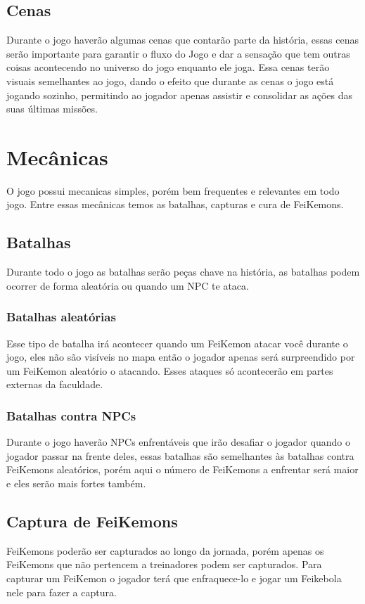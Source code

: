 \documentclass[a4paper,12pt]{article}
\begin{document}
\subsection{Cenas}
Durante o jogo haverão algumas cenas que contarão parte da história, essas cenas serão importante para garantir o fluxo do Jogo
e dar a sensação que tem outras coisas acontecendo no universo do jogo enquanto ele joga. Essa cenas terão visuais semelhantes ao jogo, dando
o efeito que durante as cenas o jogo está jogando sozinho, permitindo ao jogador apenas assistir e consolidar as ações das suas últimas missões.

\newpage
\section{Mecânicas}
O jogo possui mecanicas simples, porém bem frequentes e relevantes em todo jogo. Entre essas mecânicas temos as batalhas, capturas e cura de FeiKemons.

\subsection{Batalhas}
Durante todo o jogo as batalhas serão peças chave na história, as batalhas podem ocorrer de forma aleatória ou quando um NPC te ataca.

\subsubsection{Batalhas aleatórias}
Esse tipo de batalha irá acontecer quando um FeiKemon atacar você durante o jogo, eles não são visíveis no mapa então o jogador apenas
será surpreendido por um FeiKemon aleatório o atacando. Esses ataques só acontecerão em partes externas da faculdade.

\subsubsection{Batalhas contra NPCs}
Durante o jogo haverão NPCs enfrentáveis que irão desafiar o jogador quando o jogador passar na frente deles, essas batalhas são semelhantes às
batalhas contra FeiKemons aleatórios, porém aqui o número de FeiKemons a enfrentar será maior e eles serão mais fortes também.

\subsection{Captura de FeiKemons}
FeiKemons poderão ser capturados ao longo da jornada, porém apenas os FeiKemons que não pertencem a treinadores podem ser capturados.
Para capturar um FeiKemon o jogador terá que enfraquece-lo e jogar um Feikebola nele para fazer a captura.
\end{document}
